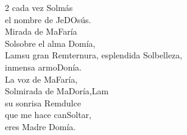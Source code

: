 \begin{center}
\begin{multicols}{2}
{cada vez \ac{Sol}más\\
el nombre de Je\ac{DO}sús.\\
\vspace{1em}
Mirada de Ma\ac{Fa}ría\\
\ac{Sol}sobre el alma \ac{Do}mía,\\
\ac{Lam}su gran \ac{Rem}ternura,
esplendida \ac{Sol}belleza,\\
inmensa armo\ac{Do}nía.\\
\vspace{1em}
La voz de Ma\ac{Fa}ría,\\
\ac{Sol}mirada de Ma\ac{Do}ría,\ac{Lam}\\
su sonrisa \ac{Rem}dulce\\
que me hace can\ac{Sol}tar,\\
eres Madre \ac{Do}mía.\\}
\end{multicols}
\end{center}